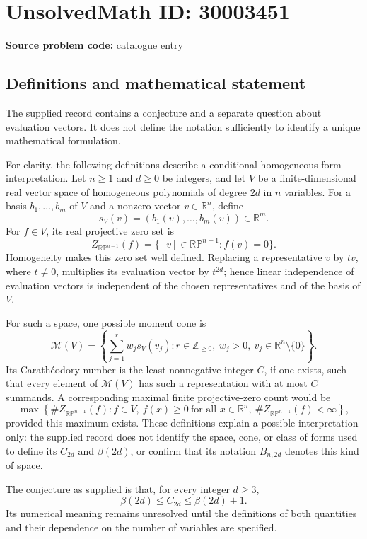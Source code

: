 \documentclass[11pt]{article}
\newcommand{\Z}{\mathbb{Z}}
\newcommand{\R}{\mathbb{R}}
\newcommand{\PP}{\mathbb{P}}
\begin{document}
\section*{UnsolvedMath ID: 30003451}
\textbf{Source problem code:} catalogue entry
\subsection{Definitions and mathematical statement}
The supplied record contains a conjecture and a separate question about evaluation vectors. It does not define the notation sufficiently to identify a unique mathematical formulation.

For clarity, the following definitions describe a conditional homogeneous-form interpretation. Let \(n\geq1\) and \(d\geq0\) be integers, and let \(V\) be a finite-dimensional real vector space of homogeneous polynomials of degree \(2d\) in \(n\) variables. For a basis \(b_1,\ldots,b_m\) of \(V\) and a nonzero vector \(v\in\R^n\), define
\[
 s_V(v)=(b_1(v),\ldots,b_m(v))\in\R^m.
\]
For \(f\in V\), its real projective zero set is
\[
 Z_{\R\PP^{n-1}}(f)=\{[v]\in\R\PP^{n-1}:f(v)=0\}.
\]
Homogeneity makes this zero set well defined. Replacing a representative \(v\) by \(tv\), where \(t\neq0\), multiplies its evaluation vector by \(t^{2d}\); hence linear independence of evaluation vectors is independent of the chosen representatives and of the basis of \(V\).

For such a space, one possible moment cone is
\[
 \mathcal M(V)=\left\{\sum_{j=1}^{r}w_j s_V(v_j): r\in\Z_{\geq0},\ w_j>0,\ v_j\in\R^n\setminus\{0\}\right\}.
\]
Its Carath\'{e}odory number is the least nonnegative integer \(C\), if one exists, such that every element of \(\mathcal M(V)\) has such a representation with at most \(C\) summands. A corresponding maximal finite projective-zero count would be
\[
 \max\left\{\#Z_{\R\PP^{n-1}}(f): f\in V,\ f(x)\geq0\ \text{for all }x\in\R^n,\ \#Z_{\R\PP^{n-1}}(f)<\infty\right\},
\]
provided this maximum exists. These definitions explain a possible interpretation only: the supplied record does not identify the space, cone, or class of forms used to define its \(C_{2d}\) and \(\beta(2d)\), or confirm that its notation \(B_{n,2d}\) denotes this kind of space.

The conjecture as supplied is that, for every integer \(d\geq3\),
\[
 \beta(2d)\leq C_{2d}\leq\beta(2d)+1.
\]
Its numerical meaning remains unresolved until the definitions of both quantities and their dependence on the number of variables are specified.
\end{document}
